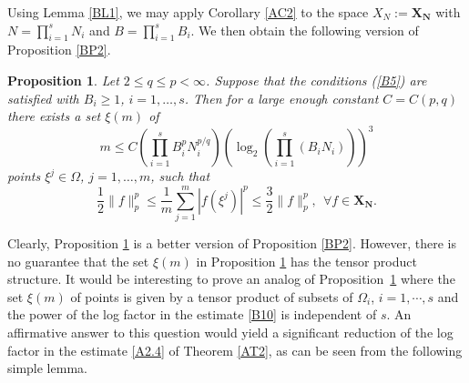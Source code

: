 \documentclass[12pt]{article}
\def\Og{\Omega}
\def\bN{\mathbf N}
\def\bX{\mathbf X}
\def\Og{\Omega}
\newtheorem{Proposition}{Proposition}[section]
\numberwithin{equation}{section}
\newcommand{\be}{\begin{equation}}
\newcommand{\ee}{\end{equation}}
\begin{document}
 Using Lemma \ref{BL1}, we may apply  Corollary \ref{AC2} to the space $X_N:=\bX_{\bN}$ with  $N=\prod_{i=1}^s N_i$ and $B=\prod_{i=1}^s B_i$. We then obtain  the following version of Proposition \ref{BP2}.
 
 \begin{Proposition}\label{BP3} Let $2\le q \le p<\infty$. Suppose that the  conditions (\ref{B5}) are satisfied with $B_i\ge 1$, $i=1,\dots,s$. Then for a large enough constant $C=C(p,q)$ there exists a set $\xi(m)$  of
\be\label{B10}
m \le C \left(\prod_{i=1}^sB_i^{p}N_i^{p/q}\right) \left(\log_2(\prod_{i=1}^s(B_i  N_i))\right)^3
\ee
 points $\xi^j\in \Omega$, $j=1,\dots,m$,   such that 
\be\label{B11}
\frac{1}{2}\|f\|_p^p \le \frac{1}{m}\sum_{j=1}^m |f(\xi^j)|^p \le \frac{3}{2} \|f\|_p^p,\   \ \forall f\in \bX_\bN.
\ee
\end{Proposition}	

 Clearly,  Proposition \ref{BP3} is a better version of Proposition \ref{BP2}. However, there is no guarantee that   the set $\xi(m)$   in Proposition \ref{BP3}   has   the tensor product structure. It would be interesting to prove    an analog of Proposition~\ref{BP3} where   	the set $\xi(m)$ of points is    given by  a tensor product of subsets of $\Og_i$, $i=1,\cdots,s$ and the power of the log factor in the estimate \eqref{B10}  is independent of $s$.  An affirmative answer to this question would   yield a significant reduction  of the log factor  in  the estimate \eqref{A2.4} of  Theorem \ref{AT2}, as can be seen from the following simple  lemma.
  
\end{document}
